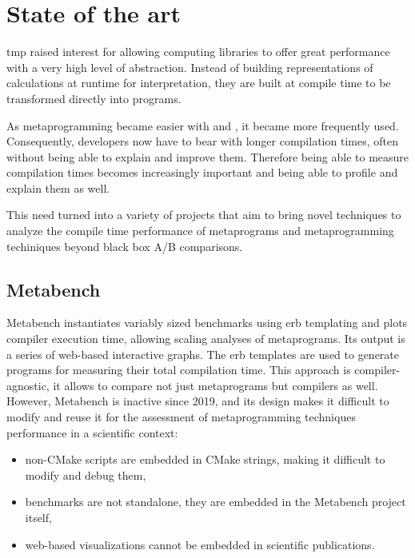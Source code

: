 \documentclass[../main]{subfiles}
\begin{document}
\section{
  State of the art
}

\cpp \gls{tmp} raised interest for allowing computing libraries
to offer great performance with a very high level of abstraction.
Instead of building representations of calculations at runtime for
interpretation, they are built at compile time to be transformed directly into
programs.

As metaprogramming became easier with  and ,
it became more frequently used.
Consequently, developers now have to bear with longer
compilation times, often without being able to explain and improve them.
Therefore being able to measure compilation times becomes increasingly important
and being able to profile and explain them as well.

This need turned into a variety of projects that aim to bring novel techniques
to analyze the compile time performance of \cpp metaprograms and metaprogramming
techiniques beyond black box A/B comparisons.

\subsection{
  Metabench
}

Metabench\cite{metabench} instantiates variably sized benchmarks using
\gls{erb} templating and plots compiler execution time, allowing
scaling analyses of metaprograms. Its output is a series of web-based
interactive graphs.
The \gls{erb} templates are used to generate \cpp programs for measuring their
total compilation time. This approach is compiler-agnostic, it allows to compare
not just metaprograms but compilers as well.
\\

However, Metabench is inactive since 2019, and its design makes it
difficult to modify and reuse it for the assessment of metaprogramming
techniques performance in a scientific context:

\begin{itemize}
\item
non-CMake scripts are embedded in CMake strings, making it difficult to modify
and debug them,

\item
benchmarks are not standalone, they are embedded in the Metabench
project itself,

\item
web-based visualizations cannot be embedded in scientific publications.

\end{itemize}
\end{document}
